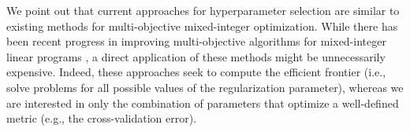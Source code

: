 \documentclass[mnsc,nonblindrev]{informs3} %
\newcommand{\ag}[1]{{\color{black}#1}}
\begin{document}

{We point out that current approaches for hyperparameter selection are similar to existing methods for multi-objective mixed-integer optimization. While there has been recent progress in improving multi-objective algorithms for mixed-integer linear programs \citep{lokman2013finding,stidsen2014branch}, %
a direct application of these methods might be unnecessarily expensive. Indeed, these approaches seek to compute the efficient frontier \citep{boland2015criterion,boland2015criterion2} (i.e., solve problems for all possible values of the regularization parameter), whereas we are interested in only the combination of parameters that optimize a well-defined metric (e.g., \ag{\color{black}the cross-validation error}). %
}
\end{document}
